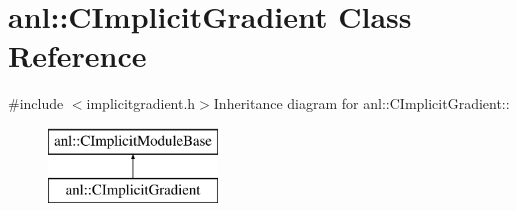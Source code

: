 \hypertarget{classanl_1_1CImplicitGradient}{
\section{anl::CImplicitGradient Class Reference}
\label{classanl_1_1CImplicitGradient}
}


{\ttfamily \#include $<$implicitgradient.h$>$}Inheritance diagram for anl::CImplicitGradient::\begin{figure}[H]
\begin{center}
\leavevmode
\includegraphics[height=2cm]{classanl_1_1CImplicitGradient}
\end{center}
\end{figure}

